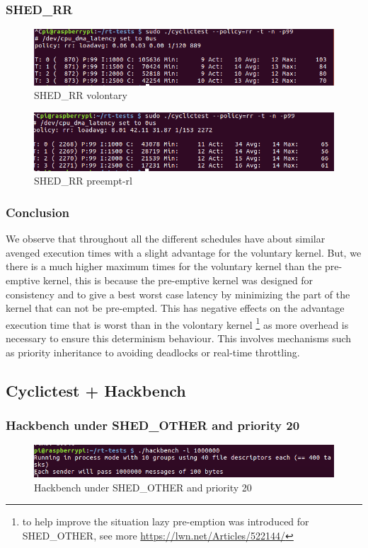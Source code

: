 \documentclass[10pt,a4paper]{article}
\begin{document}
\subsubsection{SHED\_RR}
\begin{figure}[h]
\includegraphics[width=16cm]{Voluntary-RR-WithoutHackbench.png}
\caption{SHED\_RR volontary}
\end{figure}
\begin{figure}[H]
\includegraphics[width=16cm]{Preempt-RR-WithoutHackbench.png}
\caption{SHED\_RR preempt-rl}
\end{figure}
\subsubsection{Conclusion}
We observe that throughout all the different schedules have about similar avenged execution times with a slight advantage for the voluntary kernel. But, we there is a much higher maximum times for the voluntary kernel than the pre-emptive kernel, this is because the pre-emptive kernel was designed for consistency and to give a best worst case latency by minimizing the part of the kernel that can not be pre-empted.  This has negative effects on the advantage execution time that is worst than in the volontary kernel \footnote{to help improve the situation lazy pre-emption was introduced for SHED\_OTHER, see more \url{https://lwn.net/Articles/522144/}} as more overhead is necessary to ensure this determinism behaviour. This involves mechanisms such as priority inheritance to avoiding deadlocks or real-time throttling.

\subsection{Cyclictest + Hackbench}
\subsubsection{Hackbench under SHED\_OTHER and priority 20}
\begin{figure}[H]
\includegraphics[width=16cm]{Volontary-other-Hackbench-p20.png}
\caption{Hackbench under SHED\_OTHER and priority 20}
\end{figure}
\end{document}
